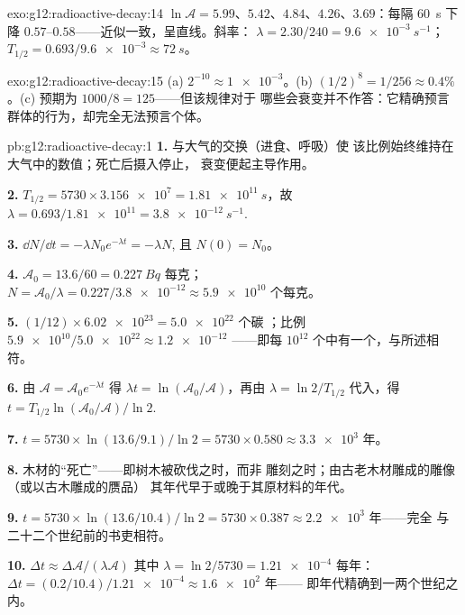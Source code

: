 \begin{solution}{exo:g12:radioactive-decay:14}
$\ln \mathcal A = 5.99$、$5.42$、$4.84$、$4.26$、$3.69$：每隔
\qty{60}{s} 下降 $0.57$--$0.58$——近似一致，呈直线。斜率：
$\lambda = 2.30/240 = \qty{9.6e-3}{s^{-1}}$；
$T_{1/2} = 0.693/\num{9.6e-3} \approx \qty{72}{s}$。
\end{solution}

\begin{solution}{exo:g12:radioactive-decay:15}
(a) $2^{-10} \approx \num{1e-3}$。(b) $(1/2)^8 = 1/256 \approx
0.4\%$。(c) 预期为 $1000/8 = 125$——但该规律对于
哪些会衰变并不作答：它精确预言群体的行为，却完全无法预言个体。
\end{solution}

\begin{solution}{pb:g12:radioactive-decay:1}
\textbf{1.} 与大气的交换（进食、呼吸）使
该比例始终维持在大气中的数值；死亡后摄入停止，
衰变便起主导作用。

\textbf{2.} $T_{1/2} = \num{5730} \times \num{3.156e7} =
\qty{1.81e11}{s}$，故 $\lambda = 0.693/\num{1.81e11} =
\qty{3.8e-12}{s^{-1}}$.

\textbf{3.} $\dd N/\dd t = -\lambda N_0 e^{-\lambda t} = -\lambda N$,
且 $N(0) = N_0$。

\textbf{4.} $\mathcal A_0 = 13.6/60 = \qty{0.227}{Bq}$ 每克；
$N = \mathcal A_0/\lambda = 0.227/\num{3.8e-12} \approx \num{5.9e10}$
个每克。

\textbf{5.} $(1/12) \times \num{6.02e23} = \num{5.0e22}$ 个碳
；比例 $\num{5.9e10}/\num{5.0e22} \approx \num{1.2e-12}$
——即每 $10^{12}$ 个中有一个，与所述相符。

\textbf{6.} 由 $\mathcal A = \mathcal A_0 e^{-\lambda t}$ 得
$\lambda t = \ln(\mathcal A_0/\mathcal A)$，再由 $\lambda =
\ln 2/T_{1/2}$ 代入，得
$t = T_{1/2}\ln(\mathcal A_0/\mathcal A)/\ln 2$.

\textbf{7.} $t = \num{5730} \times \ln(13.6/9.1)/\ln 2 =
\num{5730} \times 0.580 \approx \num{3.3e3}$ 年。

\textbf{8.} 木材的“死亡”——即树木被砍伐之时，而非
雕刻之时；由古老木材雕成的雕像（或以古木雕成的赝品）
其年代早于或晚于其原材料的年代。

\textbf{9.} $t = \num{5730} \times \ln(13.6/10.4)/\ln 2 =
\num{5730} \times 0.387 \approx \num{2.2e3}$ 年——完全
与二十二个世纪前的书吏相符。

\textbf{10.} $\Delta t \approx \Delta\mathcal A/(\lambda\mathcal A)$
其中 $\lambda = \ln 2/5730 = \num{1.21e-4}$ 每年：
$\Delta t = (0.2/10.4)/\num{1.21e-4} \approx \num{1.6e2}$ 年——
即年代精确到一两个世纪之内。


\end{solution}
